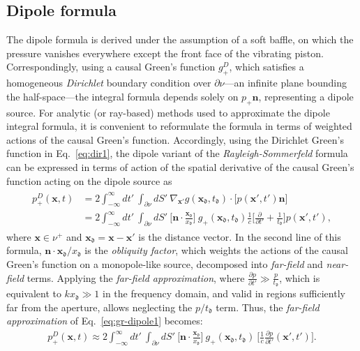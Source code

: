 \documentclass[11pt,reqno]{amsart}
\theoremstyle{remark}
\theoremstyle{italic_lemma}
\newcommand{\bx}{\boldsymbol{x}}
\newcommand{\bn}{\boldsymbol{n}}
\newcommand{\fd}{\mathfrak{d}}
\begin{document}
\subsection{Dipole formula} \label{sec:dipole} 
The dipole formula is derived under the assumption of a soft baffle, on which the pressure vanishes everywhere except the front face of the vibrating piston. Correspondingly, using a causal Green's function $g_+^D$, which satisfies a homogeneous \textit{Dirichlet} boundary condition over $\partial \nu$—an infinite plane bounding the half-space—the integral formula depends solely on $p_+ \bn$, representing a dipole source. For analytic (or ray-based) methods used to approximate the dipole integral formula, it is convenient to reformulate the formula in terms of weighted actions of the causal Green's function. Accordingly, using the Dirichlet Green's function in Eq.~\eqref{eq:dir1}, the dipole variant of the \textit{Rayleigh-Sommerfeld} formula can be expressed in terms of action of the spatial derivative of the causal Green's function acting on the dipole source as 
\begin{align} \label{eq:gr-dipole1}
\begin{split}
    p_+^D(\bx, t) &= 2  \int_{-\infty}^{\infty} dt' \ \int_{\partial \nu} dS' \   \nabla_{\bx'}  g(\bx_{\fd}, t_{\fd}) \cdot \Big[ p(\bx', t') \bn \Big] \\
    & = 2 \int_{-\infty}^{\infty} dt' \ \int_{\partial \nu} dS' \  \Big[ \bn \cdot \frac{\bx_{\fd}}{x_{\fd}}\Big]  \ g_+(\bx_{\fd}, t_{\fd}) \frac{1}{c}\Big[ \frac{\partial}{\partial t'} + \frac{1}{t_{\fd}} \Big] p(\bx', t'), 
\end{split}
\end{align}
where $\bx \in \nu^+$ and $\bx_{\fd} = \bx - \bx'$ is the distance vector. In the second line of this formula, $\bn \cdot \bx_{\fd}/x_{\fd}$ is the \textit{obliquity factor}, which weights the actions of the causal Green's function on a monopole-like source, decomposed into \textit{far-field} and \textit{near-field} terms. Applying the \textit{far-field approximation}, where $ \frac{\partial p}{\partial t'} \gg \frac{p}{t_{\fd}} $, which is equivalent to $k x_{\fd} \gg 1$ in the frequency domain, and valid in regions sufficiently far from the aperture, allows neglecting the $p/t_{\fd}$ term. Thus, the \textit{far-field approximation} of Eq.~\eqref{eq:gr-dipole1} becomes:
\begin{align} \label{eq:gr-rsd}
    p_+^D(\bx, t) \approx   2  \int_{-\infty}^{\infty} dt' \ \int_{\partial \nu} dS' \     \Big[ \bn \cdot \frac{\bx_{\fd}}{x_{\fd}} \Big] \ g_+(\bx_{\fd}, t_{\fd}) \ \bigg[  \frac{1}{c}  \frac{\partial p}{\partial t'}  (\bx', t')  \bigg].
\end{align}
\end{document}
